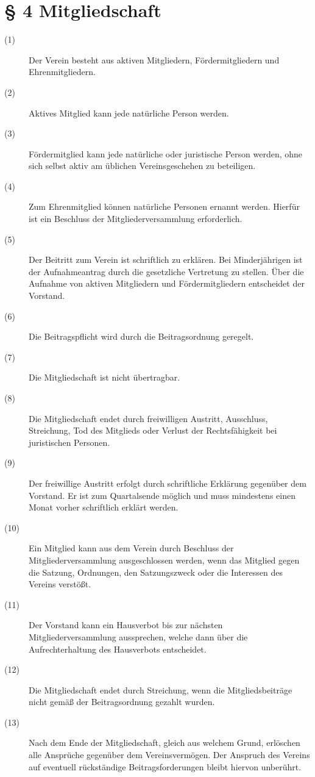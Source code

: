 \documentclass[a4paper,12pt]{scrartcl}
\begin{document}
\section*{\S{} 4 Mitgliedschaft}
\begin{description} 

\item[(1)] Der Verein besteht aus aktiven Mitgliedern, Fördermitgliedern und Ehrenmitgliedern.
\item[(2)] Aktives Mitglied kann jede natürliche Person werden.
\item[(3)] Fördermitglied kann jede natürliche oder juristische Person werden, ohne sich selbst aktiv am üblichen Vereinsgeschehen zu beteiligen.
\item[(4)] Zum Ehrenmitglied können natürliche Personen ernannt werden. Hierfür ist ein Beschluss der Mitgliederversammlung erforderlich.
\item[(5)] Der Beitritt zum Verein ist schriftlich zu erklären. Bei Minderjährigen ist der Aufnahmeantrag durch die gesetzliche Vertretung zu stellen. Über die Aufnahme von aktiven Mitgliedern und Fördermitgliedern entscheidet der Vorstand.
\item[(6)] Die Beitragspflicht wird durch die Beitragsordnung geregelt.
\item[(7)] Die Mitgliedschaft ist nicht übertragbar. 
\item[(8)] Die Mitgliedschaft endet durch freiwilligen Austritt, Ausschluss, Streichung, Tod des Mitglieds oder Verlust der Rechtsfähigkeit bei juristischen Personen.
\item[(9)] Der freiwillige Austritt erfolgt durch schriftliche Erklärung gegenüber dem Vorstand. Er ist zum Quartalsende möglich und muss mindestens einen Monat vorher schriftlich erklärt werden.
\item[(10)] Ein Mitglied kann aus dem Verein durch Beschluss der Mitgliederversammlung ausgeschlossen werden, wenn das Mitglied gegen die Satzung, Ordnungen, den Satzungszweck oder die Interessen des Vereins verstößt. 
\item[(11)]Der Vorstand kann ein Hausverbot bis zur nächsten Mitgliederversammlung aussprechen, welche dann über die Aufrechterhaltung des Hausverbots entscheidet.
\item[(12)] Die Mitgliedschaft endet durch Streichung, wenn die Mitgliedsbeiträge nicht gemäß der Beitragsordnung gezahlt wurden.  
\item[(13)] Nach dem Ende der Mitgliedschaft, gleich aus welchem Grund, erlöschen alle Ansprüche gegenüber dem Vereinsvermögen. Der Anspruch des Vereins auf eventuell rückständige Beitragsforderungen bleibt hiervon unberührt.

\end{description}
\end{document}
